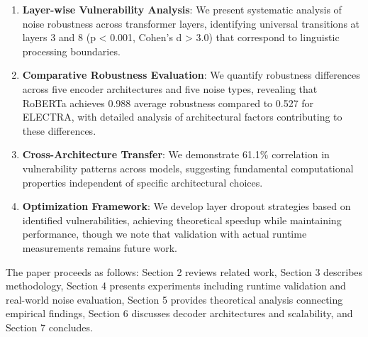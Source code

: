 \begin{enumerate}
\item \textbf{Layer-wise Vulnerability Analysis}: We present systematic analysis of noise robustness across transformer layers, identifying universal transitions at layers 3 and 8 (p < 0.001, Cohen's d > 3.0) that correspond to linguistic processing boundaries.

\item \textbf{Comparative Robustness Evaluation}: We quantify robustness differences across five encoder architectures and five noise types, revealing that RoBERTa achieves 0.988 average robustness compared to 0.527 for ELECTRA, with detailed analysis of architectural factors contributing to these differences.

\item \textbf{Cross-Architecture Transfer}: We demonstrate 61.1\% correlation in vulnerability patterns across models, suggesting fundamental computational properties independent of specific architectural choices.

\item \textbf{Optimization Framework}: We develop layer dropout strategies based on identified vulnerabilities, achieving theoretical speedup while maintaining performance, though we note that validation with actual runtime measurements remains future work.
\end{enumerate}

The paper proceeds as follows: Section 2 reviews related work, Section 3 describes methodology, Section 4 presents experiments including runtime validation and real-world noise evaluation, Section 5 provides theoretical analysis connecting empirical findings, Section 6 discusses decoder architectures and scalability, and Section 7 concludes.